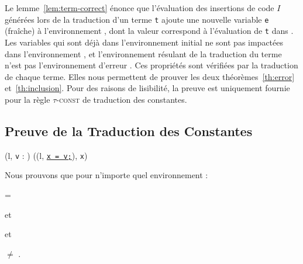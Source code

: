 Le lemme~\ref{lem:term-correct} énonce que l'évaluation des insertions de code
$I$ générées lors de la traduction d'un terme \lstinline't' ajoute une nouvelle
variable \lstinline'e' (fraîche) à l'environnement \env, dont la valeur
correspond à l'évaluation de \lstinline't' dans \env.
Les variables qui sont déjà dans l'environnement initial \env ne sont pas
impactées dans l'environnement , et l'environnement résulant
de la traduction du terme n'est pas l'environnement d'erreur \errorenv.
Ces propriétés sont vérifiées par la traduction de chaque terme.
Elles nous permettent de prouver les deux théorèmes~\ref{th:error}
et~\ref{th:inclusion}.
Pour des raisons de lisibilité, la preuve est uniquement fournie pour la règle
\textsc{$\tau$-const} de traduction des constantes.




\subsection{Preuve de la Traduction des Constantes}

{
  { (l, \mbox{\lstinline'v'} : ) 
    ((l, \Zinit\underline{\mbox{\lstinline'x = v;'}}), \mbox{\lstinline'x'}) }
}

Nous prouvons que pour n'importe quel environnement \env  :

= 

et

\env \subenv {}

et

 $\neq$ \errorenv.

